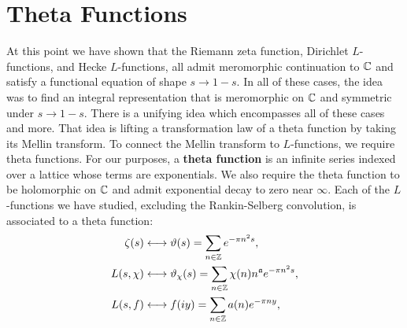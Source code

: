 \documentclass[12pt,oneside]{book}
\begin{document}
    \section{Theta Functions}
        At this point we have shown that the Riemann zeta function, Dirichlet $L$-functions, and Hecke $L$-functions, all admit meromorphic continuation to $\mathbb{C}$ and satisfy a functional equation of shape $s \to 1-s$. In all of these cases, the idea was to find an integral representation that is meromorphic on $\mathbb{C}$ and symmetric under $s \to 1-s$. There is a unifying idea which encompasses all of these cases and more. That idea is lifting a transformation law of a theta function by taking its Mellin transform. To connect the Mellin transform to $L$-functions, we require theta functions. For our purposes, a \textbf{theta function} is an infinite series indexed over a lattice whose terms are exponentials. We also require the theta function to be holomorphic on $\mathbb{C}$ and admit exponential decay to zero near $\infty$. Each of the $L$-functions we have studied, excluding the Rankin-Selberg convolution, is associated to a theta function:
        \begin{align*}
        \zeta(s) &\longleftrightarrow \vartheta(s) = \sum_{n \in \mathbb{Z}}e^{-\pi n^{2}s}, \\
        L(s,\chi) &\longleftrightarrow \vartheta_{\chi}(s) = \sum_{n \in \mathbb{Z}}\chi(n)n^{\mathfrak{a}}e^{-\pi n^{2}s}, \\
        L(s,f) &\longleftrightarrow f(iy) = \sum_{n \in \mathbb{Z}}a(n)e^{-\pi ny},
        \end{align*}
\end{document}
